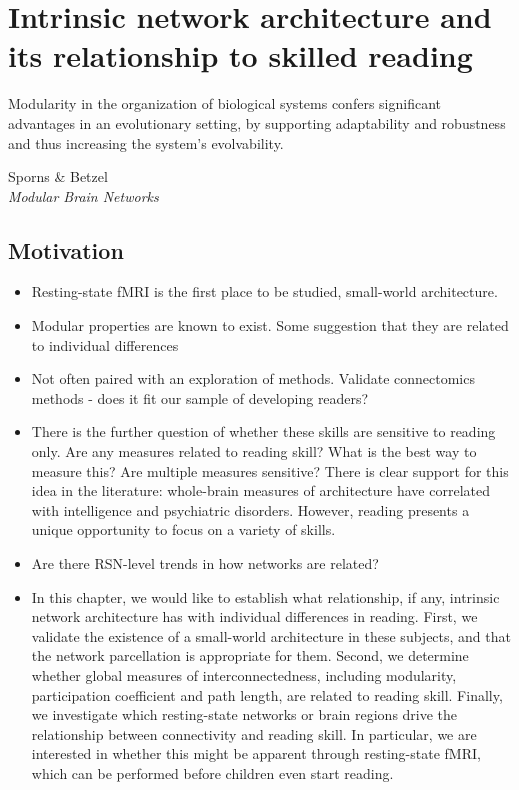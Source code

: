 \chapter{Intrinsic network architecture and its relationship to skilled reading}

\epigraph{Modularity in the organization of biological systems confers significant advantages in an evolutionary setting, by supporting adaptability and robustness and thus increasing the system's evolvability.}{Sporns \& Betzel\\\textit{Modular Brain Networks}}

\section{Motivation}

\begin{itemize}
    \item Resting-state fMRI is the first place to be studied, small-world architecture.
    \item Modular properties are known to exist. Some suggestion that they are related to individual differences 
    \item Not often paired with an exploration of methods. Validate connectomics methods - does it fit our sample of developing readers?
    \item There is the further question of whether these skills are sensitive to reading only. Are any measures related to reading skill? What is the best way to measure this? Are multiple measures sensitive? There is clear support for this idea in the literature: whole-brain measures of architecture have correlated with intelligence and psychiatric disorders. However, reading presents a unique opportunity to focus on a variety of skills.
    \item Are there RSN-level trends in how networks are related?
    \item In this chapter, we would like to establish what relationship, if any,  intrinsic network architecture has with individual differences in reading. First, we validate the existence of a small-world architecture in these subjects, and that the network parcellation is appropriate for them. Second, we determine whether global measures of interconnectedness, including modularity, participation coefficient and path length, are related to reading skill. Finally, we investigate which resting-state networks or brain regions drive the relationship between connectivity and reading skill. In particular, we are interested in whether this might be apparent through resting-state fMRI, which can be performed before children even start reading.
\end{itemize}


